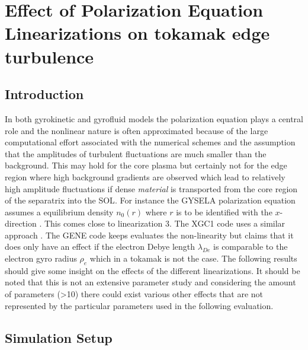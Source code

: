 \documentclass[master.tex]{subfiles}
\begin{document}
\chapter{Effect of Polarization Equation Linearizations on tokamak edge turbulence}\label{sec:polarization_equation_evaluation}

\section{Introduction}
In both gyrokinetic and gyrofluid models the polarization equation plays a central role and the nonlinear nature is often approximated because of the large computational effort associated with the numerical schemes and the assumption that the amplitudes of turbulent fluctuations are much smaller than the background. This may hold for the core plasma but certainly not for the edge region where high background gradients are observed which lead to relatively high amplitude fluctuations if dense \textit{material} is transported from the core region of the separatrix into the \ac{SOL}. For instance the GYSELA polarization equation assumes a equilibrium density $n_0(r)$ where $r$ is to be identified with the $x$-direction \cite{GYSELACODE}. This comes close to linearization 3. The XGC1 code uses a similar approach \cite{XGC1Code}. The GENE code keeps evaluates the non-linearity but claims that it does only have an effect if the electron Debye length $\lambda_{De}$ is comparable to the electron gyro radius $\rho_e$ which in a tokamak is not the case. The following results should give some insight on the effects of the different linearizations. It should be noted that this is not an extensive parameter study and considering the amount of parameters (>10) there could exist various other effects that are not represented by the particular parameters used in the following evaluation.

\section{Simulation Setup}
\end{document}
